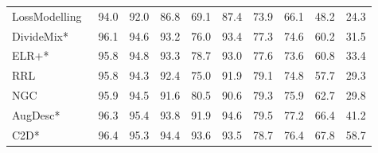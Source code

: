 \documentclass{bmvc2k}
\begin{document}
\begin{table*}[htbp]
\begin{center}
{\begin{tabular}{@{}l|ccccc|cccc@{}}
LossModelling~\citep{lossmodellingbmm} & \multicolumn{1}{c|}{94.0}          & \multicolumn{1}{c|}{92.0}          & \multicolumn{1}{c|}{86.8}          & \multicolumn{1}{c|}{69.1}          & 87.4          & \multicolumn{1}{c|}{73.9}          & \multicolumn{1}{c|}{66.1}          & \multicolumn{1}{c|}{48.2}          & 24.3          \\
DivideMix*~\citep{dividemix}            & \multicolumn{1}{c|}{96.1}          & \multicolumn{1}{c|}{94.6}          & \multicolumn{1}{c|}{93.2}          & \multicolumn{1}{c|}{76.0}          & 93.4          & \multicolumn{1}{c|}{77.3}          & \multicolumn{1}{c|}{74.6}          & \multicolumn{1}{c|}{60.2}          & 31.5          \\
ELR+*~\citep{elr}                        & \multicolumn{1}{c|}{95.8}          & \multicolumn{1}{c|}{94.8}          & \multicolumn{1}{c|}{93.3}          & \multicolumn{1}{c|}{78.7}          & 93.0          & \multicolumn{1}{c|}{77.6}          & \multicolumn{1}{c|}{73.6}          & \multicolumn{1}{c|}{60.8}          & 33.4          \\
RRL~\citep{rrl}                        & \multicolumn{1}{c|}{95.8}          & \multicolumn{1}{c|}{94.3}          & \multicolumn{1}{c|}{92.4}          & \multicolumn{1}{c|}{75.0}          & 91.9          & \multicolumn{1}{c|}{79.1}          & \multicolumn{1}{c|}{74.8}          & \multicolumn{1}{c|}{57.7}          & 29.3          \\
NGC~\citep{ngc}                        & \multicolumn{1}{c|}{95.9}          & \multicolumn{1}{c|}{94.5}          & \multicolumn{1}{c|}{91.6}          & \multicolumn{1}{c|}{80.5}          & 90.6          & \multicolumn{1}{c|}{79.3}          & \multicolumn{1}{c|}{75.9}          & \multicolumn{1}{c|}{62.7}          & 29.8          \\
AugDesc*~\citep{augdesc}                & \multicolumn{1}{c|}{96.3}          & \multicolumn{1}{c|}{95.4}          & \multicolumn{1}{c|}{93.8}          & \multicolumn{1}{c|}{91.9}          & 94.6          & \multicolumn{1}{c|}{79.5}          & \multicolumn{1}{c|}{77.2}          & \multicolumn{1}{c|}{66.4}          & 41.2          \\
C2D*~\citep{c2d}                        & \multicolumn{1}{c|}{96.4}          & \multicolumn{1}{c|}{95.3}          & \multicolumn{1}{c|}{94.4}          & \multicolumn{1}{c|}{93.6}          & 93.5          & \multicolumn{1}{c|}{78.7}          & \multicolumn{1}{c|}{76.4}          & \multicolumn{1}{c|}{67.8}          & 58.7          \\ \midrule

\end{tabular}}
\end{center}
\end{table*}
\end{document}
